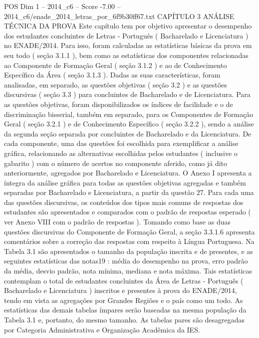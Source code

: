 \begin{textsample}{POS Dim 1 – 2014\_c6 – Score -7.00 – 2014\_c6/enade\_2014\_letras\_por\_6f9b30ff67.txt}  \label{ex:f1_pos_424}
CAPÍTULO 3 ANÁLISE TÉCNICA DA PROVA Este capítulo tem por objetivo apresentar o desempenho dos estudantes concluintes de Letras - Português ( Bacharelado e Licenciatura ) no ENADE/2014.
Para isso, foram calculadas as estatísticas básicas da prova em seu todo ( seção 3.1.1 ), bem como as estatísticas dos componentes relacionadas ao Componente de Formação Geral ( seção 3.1.2 ) e ao de Conhecimento Específico da Área ( seção 3.1.3 ).
Dadas as suas características, foram analisadas, em separado, as questões objetivas ( seção 3.2 ) e as questões discursivas ( seção 3.3 ) para concluintes de Bacharelado e de Licenciatura.
Para as questões objetivas, foram disponibilizados os índices de facilidade e o de discriminação bisserial, também em separado, para os Componentes de Formação Geral ( seção 3.2.1 ) e de Conhecimento Específico ( seção 3.2.2 ), sendo a análise da segunda seção separada por concluintes de Bacharelado e da Licenciatura.
De cada componente, uma das questões foi escolhida para exemplificar a análise gráfica, relacionando as alternativas escolhidas pelos estudantes ( inclusive o gabarito ) com o número de acertos no componente aferido, como já dito anteriormente, agregados por Bacharelado e Licenciatura.
O Anexo I apresenta a íntegra da análise gráfica para todas as questões objetivas agregadas e também separadas por Bacharelado e Licenciatura, a partir da questão 27.
Para cada uma das questões discursivas, os conteúdos dos tipos mais comuns de respostas dos estudantes são apresentados e comparados com o padrão de respostas esperado ( ver Anexo VIII com o padrão de respostas ).
Tomando como base as duas questões discursivas do Componente de Formação Geral, a seção 3.3.1.6 apresenta comentários sobre a correção das respostas com respeito à Língua Portuguesa.
Na Tabela 3.1 são apresentados o tamanho da população inscrita e de presentes, e as seguintes estatísticas das notas19 : média do desempenho na prova, erro padrão da média, desvio padrão, nota mínima, mediana e nota máxima.
Tais estatísticas contemplam o total de estudantes concluintes da Área de Letras - Português ( Bacharelado e Licenciatura ) inscritos e presentes à prova do ENADE/2014, tendo em vista as agregações por Grandes Regiões e o país como um todo.
As estatísticas das demais tabelas ímpares serão baseadas na mesma população da Tabela 3.1 e, portanto, do mesmo tamanho.
As tabelas pares são desagregadas por Categoria Administrativa e Organização Acadêmica da IES.

\end{textsample}
